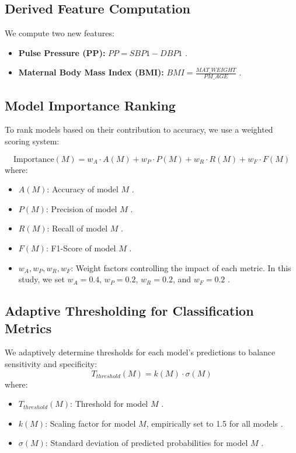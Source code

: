 \documentclass{article}
\begin{document}
\subsection{Derived Feature Computation}
We compute two new features:
\begin{itemize}
    \item \textbf{Pulse Pressure (PP):} \( PP = SBP1 - DBP1 \) \cite{wu2024}.
    \item \textbf{Maternal Body Mass Index (BMI):} \( BMI = \frac{MAT\_WEIGHT}{PM\_AGE} \) \cite{setegn2024}.
\end{itemize}

\subsection{Model Importance Ranking}
To rank models based on their contribution to accuracy, we use a weighted scoring system:

\[
\text{Importance}(M) = w_A \cdot A(M) + w_P \cdot P(M) + w_R \cdot R(M) + w_F \cdot F(M)
\]
where:
\begin{itemize}
    \item \( A(M) \): Accuracy of model \( M \) \cite{aljameel2023}.
    \item \( P(M) \): Precision of model \( M \) \cite{wu2024}.
    \item \( R(M) \): Recall of model \( M \) \cite{setegn2024}.
    \item \( F(M) \): F1-Score of model \( M \) \cite{aftab2021}.
    \item \( w_A, w_P, w_R, w_F \): Weight factors controlling the impact of each metric. In this study, we set \( w_A = 0.4 \), \( w_P = 0.2 \), \( w_R = 0.2 \), and \( w_F = 0.2 \) \cite{aljameel2023}.
\end{itemize}

\subsection{Adaptive Thresholding for Classification Metrics}
We adaptively determine thresholds for each model's predictions to balance sensitivity and specificity:
\[
T_{threshold}(M) = k(M) \cdot \sigma(M)
\]
where:
\begin{itemize}
    \item \( T_{threshold}(M) \): Threshold for model \( M \) \cite{wu2024}.
    \item \( k(M) \): Scaling factor for model \( M \), empirically set to 1.5 for all models \cite{setegn2024}.
    \item \( \sigma(M) \): Standard deviation of predicted probabilities for model \( M \) \cite{aljameel2023}.
\end{itemize}
\end{document}
